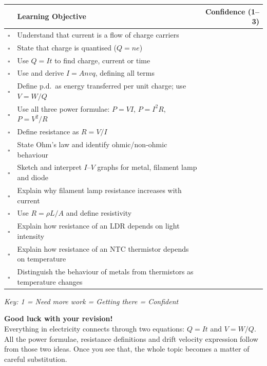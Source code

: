 \begin{tcolorbox}[colback=white, colframe=darkblue, breakable]
\renewcommand{\arraystretch}{1.5}
\begin{tabular}{@{} c p{10.5cm} r @{}}
\toprule
 & \textbf{Learning Objective} & \textbf{Confidence (1--3)} \\
\midrule
$\square$ & Understand that current is a flow of charge carriers & \\
$\square$ & State that charge is quantised ($Q = ne$) & \\
$\square$ & Use $Q = It$ to find charge, current or time & \\
$\square$ & Use and derive $I = Anvq$, defining all terms & \\
$\square$ & Define p.d.\ as energy transferred per unit charge; use $V = W/Q$ & \\
$\square$ & Use all three power formulae: $P = VI$, $P = I^2R$, $P = V^2/R$ & \\
$\square$ & Define resistance as $R = V/I$ & \\
$\square$ & State Ohm's law and identify ohmic/non-ohmic behaviour & \\
$\square$ & Sketch and interpret $I$--$V$ graphs for metal, filament lamp and diode & \\
$\square$ & Explain why filament lamp resistance increases with current & \\
$\square$ & Use $R = \rho L / A$ and define resistivity & \\
$\square$ & Explain how resistance of an LDR depends on light intensity & \\
$\square$ & Explain how resistance of an NTC thermistor depends on temperature & \\
$\square$ & Distinguish the behaviour of metals from thermistors as temperature changes & \\
\bottomrule
\end{tabular}
\vspace{0.5em}

\textit{Key: 1 = Need more work  = Getting there  = Confident}
\end{tcolorbox}

\vspace{1em}
\begin{motivationbox}
\centering
\textbf{\color{darkblue}Good luck with your revision!}\\[0.2em]
{\color{darkgray}\small Everything in electricity connects through two equations: $Q = It$ and $V = W/Q$. All the power formulae, resistance definitions and drift velocity expression follow from those two ideas. Once you see that, the whole topic becomes a matter of careful substitution.}
\end{motivationbox}




